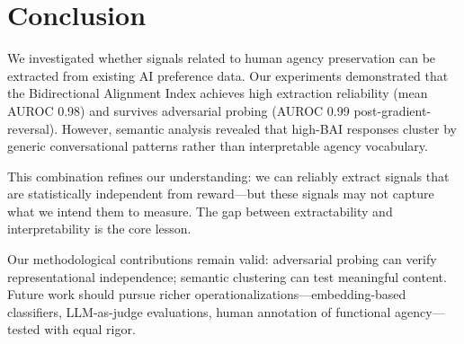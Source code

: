 \section{Conclusion}

We investigated whether signals related to human agency preservation can be extracted from existing AI preference data. Our experiments demonstrated that the Bidirectional Alignment Index achieves high extraction reliability (mean AUROC 0.98) and survives adversarial probing (AUROC 0.99 post-gradient-reversal). However, semantic analysis revealed that high-BAI responses cluster by generic conversational patterns rather than interpretable agency vocabulary.

This combination refines our understanding: we can reliably extract signals that are statistically independent from reward---but these signals may not capture what we intend them to measure. The gap between extractability and interpretability is the core lesson.

Our methodological contributions remain valid: adversarial probing can verify representational independence; semantic clustering can test meaningful content. Future work should pursue richer operationalizations---embedding-based classifiers, LLM-as-judge evaluations, human annotation of functional agency---tested with equal rigor.
